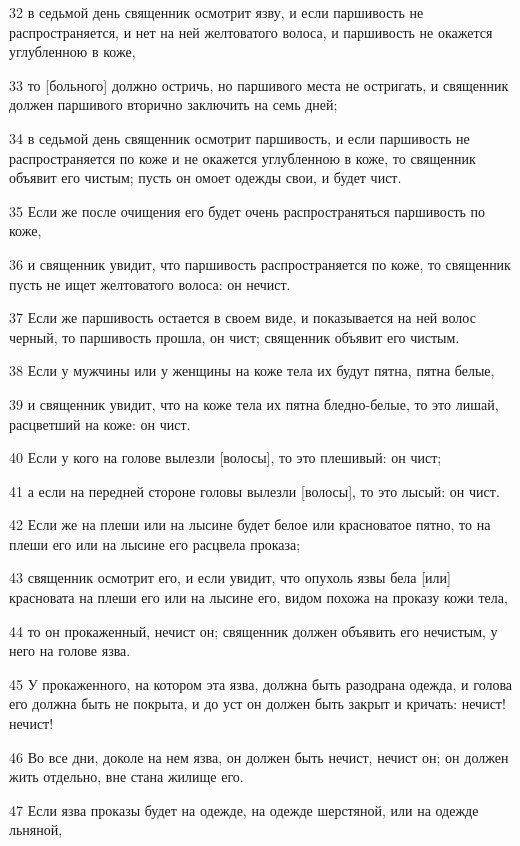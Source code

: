 \par 32 в седьмой день священник осмотрит язву, и если паршивость не распространяется, и нет на ней желтоватого волоса, и паршивость не окажется углубленною в коже,
\par 33 то [больного] должно остричь, но паршивого места не остригать, и священник должен паршивого вторично заключить на семь дней;
\par 34 в седьмой день священник осмотрит паршивость, и если паршивость не распространяется по коже и не окажется углубленною в коже, то священник объявит его чистым; пусть он омоет одежды свои, и будет чист.
\par 35 Если же после очищения его будет очень распространяться паршивость по коже,
\par 36 и священник увидит, что паршивость распространяется по коже, то священник пусть не ищет желтоватого волоса: он нечист.
\par 37 Если же паршивость остается в своем виде, и показывается на ней волос черный, то паршивость прошла, он чист; священник объявит его чистым.
\par 38 Если у мужчины или у женщины на коже тела их будут пятна, пятна белые,
\par 39 и священник увидит, что на коже тела их пятна бледно-белые, то это лишай, расцветший на коже: он чист.
\par 40 Если у кого на голове вылезли [волосы], то это плешивый: он чист;
\par 41 а если на передней стороне головы вылезли [волосы], то это лысый: он чист.
\par 42 Если же на плеши или на лысине будет белое или красноватое пятно, то на плеши его или на лысине его расцвела проказа;
\par 43 священник осмотрит его, и если увидит, что опухоль язвы бела [или] красновата на плеши его или на лысине его, видом похожа на проказу кожи тела,
\par 44 то он прокаженный, нечист он; священник должен объявить его нечистым, у него на голове язва.
\par 45 У прокаженного, на котором эта язва, должна быть разодрана одежда, и голова его должна быть не покрыта, и до уст он должен быть закрыт и кричать: нечист! нечист!
\par 46 Во все дни, доколе на нем язва, он должен быть нечист, нечист он; он должен жить отдельно, вне стана жилище его.
\par 47 Если язва проказы будет на одежде, на одежде шерстяной, или на одежде льняной,
